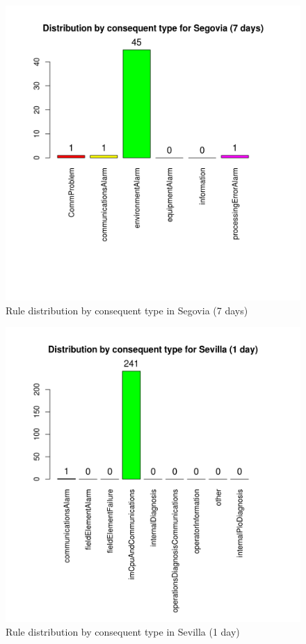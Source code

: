 \documentclass[a4paper,12pt]{article}
\begin{document}
\begin{figure}[hbtp]
\includegraphics[width=\textwidth]{img/conseqtypes_seg7.png}
\caption{Rule distribution by consequent type in Segovia (7 days)} \label{fig:conseqtypes_seg7}
\end{figure}

\begin{figure}[hbtp]
\includegraphics[width=\textwidth]{img/conseqtypes_sev1.png}
\caption{Rule distribution by consequent type in Sevilla (1 day)} \label{fig:conseqtypes_sev1}
\end{figure}
\end{document}
